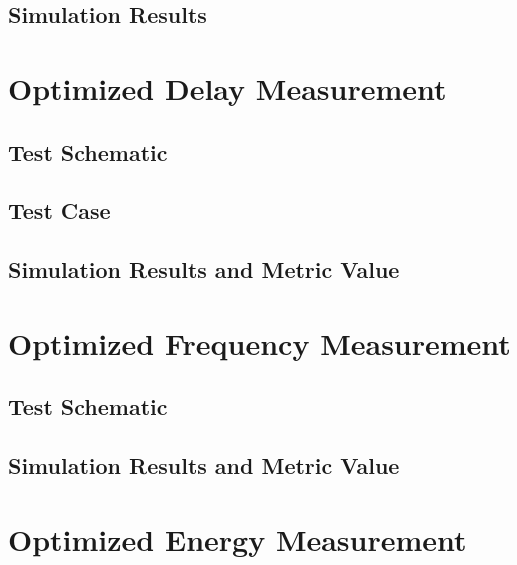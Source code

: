 \documentclass[12pt]{article}
\begin{document}
\newpage

\subsection{Simulation Results}



\newpage

\section{Optimized Delay Measurement}
\subsection{Test Schematic}



\newpage

\subsection{Test Case}



\newpage

\subsection{Simulation Results and Metric Value}



\newpage

\section{Optimized Frequency Measurement}
\subsection{Test Schematic}



\newpage

\subsection{Simulation Results and Metric Value}



\newpage

\section{Optimized Energy Measurement}
\end{document}
